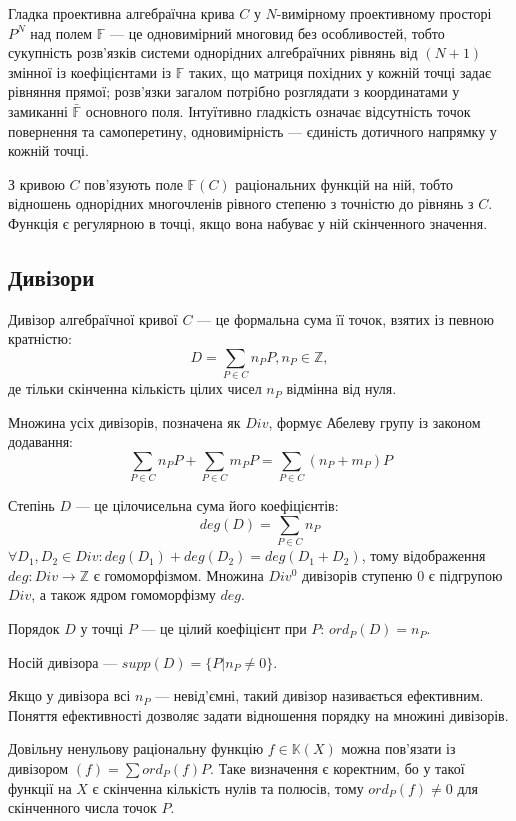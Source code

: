 \documentclass[a4paper,12pt,oneside]{article}
\begin{document}
Гладка проективна алгебраїчна крива $C$ у $N$-вимірному проективному просторі $P^N$ над полем $\mathbb{F}$ --- 
це одновимірний многовид без особливостей, тобто сукупність розв'язків системи однорідних алгебраїчних рівнянь від
$(N+1)$ змінної із коефіцієнтами із $\mathbb{F}$ таких, що матриця похідних у кожній точці задає рівняння прямої; 
розв'язки загалом потрібно розглядати з координатами у замиканні $\bar{\mathbb{F}}$ основного поля.
Інтуїтивно гладкість означає відсутність точок повернення та самоперетину, одновимірність --- єдиність 
дотичного напрямку у кожній точці.

З кривою $C$ пов'язують поле $\mathbb{F}(C)$ раціональних функцій на ній, тобто відношень однорідних многочленів 
рівного степеню з точністю до рівнянь з $C$. Функція є регулярною в точці, якщо вона набуває у ній скінченного значення.



\subsection{Дивізори}
Дивізор алгебраїчної кривої $C$ --- це формальна сума її точок, взятих із певною кратністю:
$$D = \sum_{P \in C} n_P P, n_P \in \mathbb{Z},$$
де тільки скінченна кількість цілих чисел $n_P$ відмінна від нуля.

Множина усіх дивізорів, позначена як $Div$, формує Абелеву групу із законом додавання:
$$
\sum_{P \in C} n_P P + \sum_{P \in C} m_P P = \sum_{P \in C} (n_P + m_P) P
$$

Степінь $D$ --- це цілочисельна сума його коефіцієнтів:
$$deg(D) = \sum_{P \in C} n_P$$
$\forall D_1, D_2 \in Div: deg(D_1) + deg(D_2) = deg(D_1 + D_2)$, тому відображення $deg: Div \to \mathbb{Z}$ є гомоморфізмом.
Множина $Div^0$ дивізорів ступеню 0 є підгрупою $Div$, а також ядром гомоморфізму $deg$.

Порядок $D$ у точці $P$ --- це цілий коефіцієнт при $P$: $ord_P(D) = n_P$.

Носій дивізора --- $supp(D) = \{ P | n_P \neq 0 \}$.

Якщо у дивізора всі $n_P$ --- невід'ємні, такий дивізор називається ефективним. Поняття ефективності дозволяє задати відношення порядку на множині дивізорів. 

Довільну ненульову раціональну функцію $f \in \mathbb{K}(X)$ можна пов'язати із дивізором $(f) = \sum ord_P(f)P$. 
Таке визначення є коректним, бо у такої функції на $X$ є скінченна кількість нулів та полюсів, тому $ord_P(f) \neq 0$ для скінченного числа точок $P$.
\end{document}
